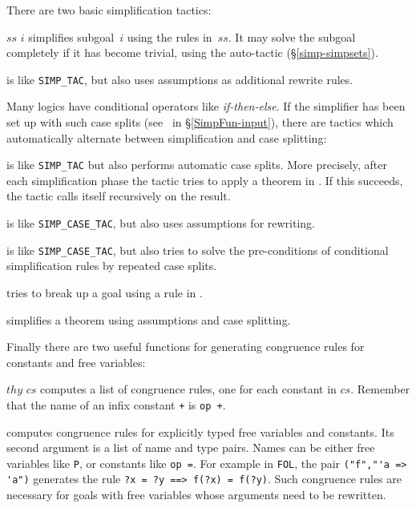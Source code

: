 There are two basic simplification tactics:
\begin{ttdescription}
\item[\ttindexbold{SIMP_TAC} $ss$ $i$] 
simplifies subgoal~$i$ using the rules in~$ss$.  It may solve the
subgoal completely if it has become trivial, using the auto-tactic
(\S\ref{simp-simpsets}).
  
\item[\ttindexbold{ASM_SIMP_TAC}] 
is like \verb$SIMP_TAC$, but also uses assumptions as additional
rewrite rules.
\end{ttdescription}
Many logics have conditional operators like {\it if-then-else}.  If the
simplifier has been set up with such case splits (see~
in \S\ref{SimpFun-input}), there are tactics which automatically alternate
between simplification and case splitting:
\begin{ttdescription}
\item[\ttindexbold{SIMP_CASE_TAC}] 
is like {\tt SIMP_TAC} but also performs automatic case splits.
More precisely, after each simplification phase the tactic tries to apply a
theorem in .  If this succeeds, the tactic calls
itself recursively on the result.

\item[\ttindexbold{ASM_SIMP_CASE_TAC}] 
is like {\tt SIMP_CASE_TAC}, but also uses assumptions for
rewriting.

\item[\ttindexbold{SIMP_CASE2_TAC}] 
is like {\tt SIMP_CASE_TAC}, but also tries to solve the
pre-conditions of conditional simplification rules by repeated case splits.

\item[\ttindexbold{CASE_TAC}] 
tries to break up a goal using a rule in
.

\item[\ttindexbold{SIMP_THM}] 
simplifies a theorem using assumptions and case splitting.
\end{ttdescription}
Finally there are two useful functions for generating congruence
rules for constants and free variables:
\begin{ttdescription}
\item[\ttindexbold{mk_congs} $thy$ $cs$] 
computes a list of congruence rules, one for each constant in $cs$.
Remember that the name of an infix constant
\verb$+$ is \verb$op +$.

\item[\ttindexbold{mk_typed_congs}] 
computes congruence rules for explicitly typed free variables and
constants.  Its second argument is a list of name and type pairs.  Names
can be either free variables like {\tt P}, or constants like \verb$op =$.
For example in {\tt FOL}, the pair
\verb$("f","'a => 'a")$ generates the rule \verb$?x = ?y ==> f(?x) = f(?y)$.
Such congruence rules are necessary for goals with free variables whose
arguments need to be rewritten.
\end{ttdescription}
